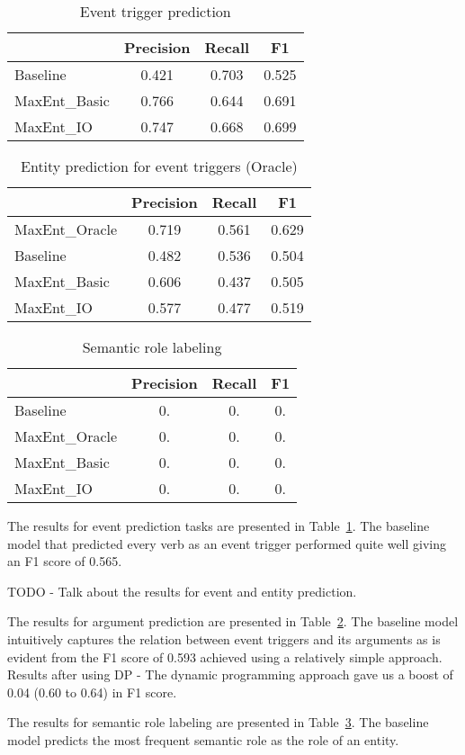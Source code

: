
\begin{table}
\centering
\begin{tabular}{|l||c|c|c|} \hline
&\textbf{Precision} & \textbf{Recall} & \textbf{F1} \\ \hline
\hline
Baseline& 0.421 & 0.703 &0.525\\
MaxEnt\_Basic& 0.766 & 0.644&  0.691 \\
MaxEnt\_IO&0.747&0.668&0.699\\
\hline
\end{tabular}
\caption{Event trigger prediction}
\label{table:eventprediction}
\end{table}

\begin{table}
\centering
\begin{tabular}{|l||c|c|c|} \hline
&\textbf{Precision} & \textbf{Recall} & \textbf{F1} \\ \hline
\hline
MaxEnt\_Oracle&0.719&0.561&0.629\\
Baseline&0.482&0.536&0.504\\
MaxEnt\_Basic&0.606&0.437&0.505\\
MaxEnt\_IO&0.577&0.477&0.519\\
\hline
\end{tabular}
\caption{Entity prediction for event triggers (Oracle)}
\label{table:entityprediction}
\end{table}

\begin{table}
\centering
\begin{tabular}{|l||c|c|c|} \hline
&\textbf{Precision} & \textbf{Recall} & \textbf{F1} \\ \hline
\hline
Baseline&0.&0.&0.\\
MaxEnt\_Oracle&0.&0.&0.\\
MaxEnt\_Basic&0.&0.&0.\\
MaxEnt\_IO&0.&0.&0.\\
\hline
\end{tabular}
\caption{Semantic role labeling}
\label{table:srlprediction}
\end{table}

The results for event prediction tasks are presented in Table~\ref{table:eventprediction}. The baseline model that predicted every verb as an event trigger performed quite well giving an F1 score of 0.565.

TODO - Talk about the results for event and entity prediction.

The results for argument prediction are presented in Table~\ref{table:entityprediction}. The baseline model intuitively captures the relation between event triggers and its arguments as is evident from the F1 score of 0.593 achieved using a relatively simple approach. Results after using DP - The dynamic programming approach gave us a boost of 0.04 (0.60 to 0.64) in F1 score. 

The results for semantic role labeling are presented in Table~\ref{table:srlprediction}. The baseline model predicts the most frequent semantic role as the role of an entity.